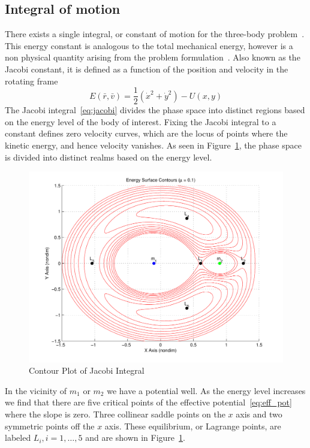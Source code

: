 \subsection{Integral of motion}
There exists a single integral, or constant of motion for the three-body problem~\cite{lanczos1970,szebehely1967}.
This energy constant is analogous to the total mechanical energy, however is a non physical quantity arising from the problem formulation~\cite{szebehely1967}.
Also known as the Jacobi constant, it is defined as a function of the position and velocity in the rotating frame
\begin{equation}
	E\left( \bar{r} , \bar{v} \right) = \frac{1}{2}\left( \dot{x}^2 + \dot{y}^2\right) - U\left(x,y \right)
	\label{eq:jacobi}
\end{equation}
The Jacobi integral~\eqref{eq:jacobi} divides the phase space into distinct regions based on the energy level of the body of interest.
Fixing the Jacobi integral to a constant defines zero velocity curves, which are the locus of points where the kinetic energy, and hence velocity vanishes.
As seen in Figure~\ref{fig:energy_contour}, the phase space is divided into distinct realms based on the energy level.
\begin{figure}[htbp]
	\includegraphics[width=\textwidth]{figures/2015_SSPI/energy_contours}
	\caption{Contour Plot of Jacobi Integral}
	\label{fig:energy_contour}
\end{figure} 
In the vicinity of \( m_1\) or \(m_2\) we have a potential well. 
As the energy level increases we find that there are five critical points of the effective potential~\eqref{eq:eff_pot} where the slope is zero.
Three collinear saddle points on the \(x\) axis and two symmetric points off the \(x\) axis.
These equilibrium, or Lagrange points, are labeled \( L_i, i = 1, \hdots, 5 \) and are shown in Figure~\ref{fig:energy_contour}.

